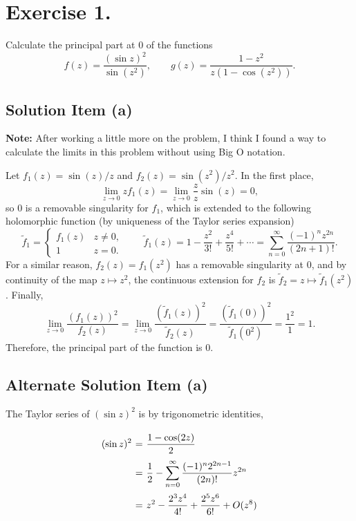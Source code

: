\section*{Exercise 1.}

Calculate the principal part at 0 of the functions
\[ f(z) = \frac{(\sin z)^2}{\sin(z^2)}, \hspace{2em} g(z) = \frac{1-z^2}{z(1-\cos(z^2))}.  \]

\subsection*{Solution Item (a)}

\textbf{Note:} After working a little more on the problem, I think I found a way to calculate the limits in this problem without using Big O notation.

Let $f_1(z) = \sin(z) / z$ and $f_2(z) = \sin(z^2)/z^2$. In the first place, 
\[ \lim_{z\to 0} z f_1(z) = \lim_{z \to 0} \frac{z}{z} \sin(z) = 0, \]
so $0$ is a removable singularity for $f_1$, which is extended to the following holomorphic function (by uniqueness of the Taylor series expansion) 
\[ \tilde{f}_1 = \begin{cases}
    f_1(z) & z \neq 0,\\
    1 & z = 0.
\end{cases}\hspace{2em}  \tilde{f}_1(z) = 1 - \frac{z^2}{3!} + \frac{z^4}{5!} + \cdots = \sum_{n = 0}^{\infty} \frac{(-1)^n z^{2n}}{(2n+1)!}. \]
For a similar reason, $f_2(z) = f_1(z^2)$ has a removable singularity at $0$, and by continuity of the map $z \mapsto z^2$, the continuous extension for $f_2$ is $\tilde{f}_2 = z \mapsto \tilde{f}_1(z^2)$. Finally,
\[ \lim_{z \to 0} \frac{(f_1(z))^2}{f_2(z)} = \lim_{z \to 0} \frac{(\tilde{f}_1(z))^2}{\tilde{f}_2(z)} = \frac{(\tilde{f}_1(0))^2}{\tilde{f}_1(0^2)} = \frac{1^2}{1} = 1. \]
Therefore, the principal part of the function is $0$.

\subsection*{Alternate Solution Item (a)}

The Taylor series of $(\sin z)^2$ is by trigonometric identities,
\[ \everymath{\displaystyle}
\arraycolsep=1.8pt\def\arraystretch{2.5}
\begin{array}{rcl}
    (\sin z)^2 & = & \frac{1-\cos(2z)}{2}\\
    & = & \frac{1}{2} - \sum_{n = 0}^{\infty} \frac{(-1)^n 2^{2n-1}}{(2n)!} z^{2n}\\
    & = & z^2 - \frac{2^3 z^4}{4!} + \frac{2^5 z^6}{6!} + O(z^8)
\end{array} \]


